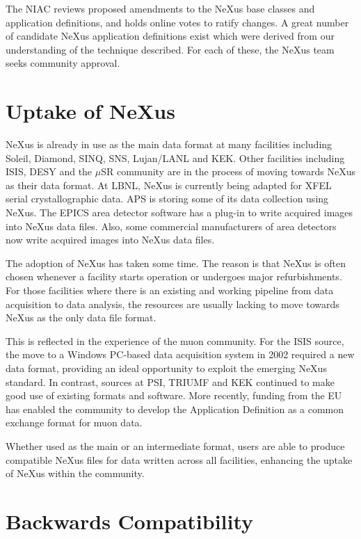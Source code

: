 \documentclass[%
 aip,
rsi,
 amsmath,amssymb,
 reprint,%
]{revtex4-1}
\begin{document}
The NIAC reviews proposed amendments to the NeXus base classes and
application definitions, and holds online votes to ratify changes.
A great number of candidate NeXus application definitions exist which were derived from our understanding of the technique described.
For each of these, the NeXus team seeks community approval. 


\section{Uptake of NeXus} 

NeXus is already in use as the main data format at many facilities including Soleil, Diamond, SINQ, SNS, Lujan/LANL 
and KEK. Other facilities including ISIS, DESY and the $\mu$SR community are in the process of moving towards 
NeXus as their data format. At LBNL, NeXus is currently being adapted for XFEL serial crystallographic data. 
APS is storing some of its data collection using NeXus.
The EPICS\cite{epicsad} area detector software has a plug-in to write acquired images into NeXus data files.
Also, some commercial manufacturers of area detectors now write acquired images into NeXus data files.

The adoption of NeXus has taken some time. The reason is that NeXus is often chosen whenever 
a facility starts operation or undergoes major refurbishments. For those facilities where there is an existing and working 
pipeline from data acquisition to data analysis,  the resources are usually lacking to move 
towards NeXus as the only data file format.

This is reflected in the experience of the muon community. For the ISIS source, the move to a Windows PC-based data acquisition 
system in 2002 required a new data format, providing an ideal opportunity to exploit the emerging NeXus standard\cite{muon1}. In 
contrast, sources at PSI, TRIUMF and KEK continued to make good use of existing formats and software. More recently, funding 
from the EU has enabled the community to develop the Application Definition as a common exchange format for muon data\cite{muon2}. 

Whether used as the main or an intermediate format, users are able to produce compatible NeXus files for data written 
across all facilities, enhancing the uptake of NeXus within the community.


\section{Backwards Compatibility}
\end{document}
